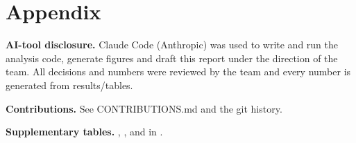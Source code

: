 \documentclass[conference]{IEEEtran}
\begin{document}
\clearpage
\section*{Appendix}
\textbf{AI-tool disclosure.} Claude Code (Anthropic) was used to write and run the analysis code, generate figures and draft this report under the direction of the team. All decisions and numbers were reviewed by the team and every number is generated from results/tables.

\textbf{Contributions.} See CONTRIBUTIONS.md and the git history.

\textbf{Supplementary tables.} , ,  and  in .



\end{document}
